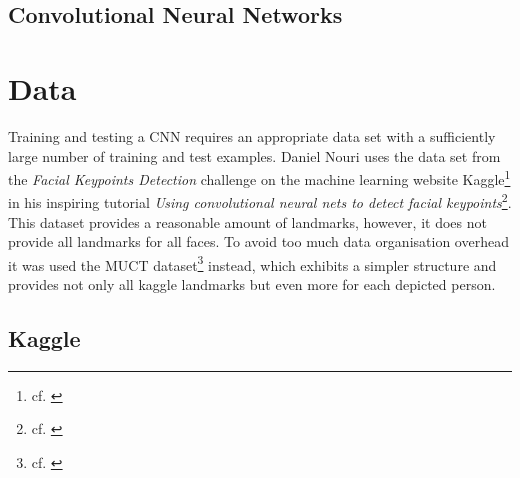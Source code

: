 \documentclass[11pt, a4paper]{article}
\begin{document}
\subsection{Convolutional Neural Networks}

\newpage

\section{Data}

Training and testing a \ac{CNN} requires an appropriate data set with a sufficiently large number of training and test examples. Daniel Nouri uses the data set from the \emph{Facial Keypoints Detection} challenge on the machine learning website Kaggle\footnote{cf. \cite{kaggle}} in his inspiring tutorial \emph{Using convolutional neural nets to detect facial keypoints}\footnote{cf. \cite{nouri-tutorial}}. This dataset provides a reasonable amount of landmarks, however, it does not provide all landmarks for all faces. To avoid too much data organisation overhead it was used the \ac{MUCT} dataset\footnote{cf. \cite{muct}} instead, which exhibits a simpler structure and provides not only all kaggle landmarks but even more for each depicted person.

\subsection{Kaggle}
\end{document}

